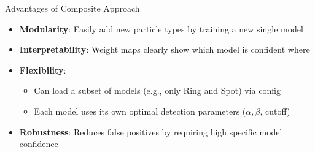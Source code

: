 \begin{frame}{Advantages of Composite Approach}
\begin{itemize}
    \item \textbf{Modularity}: Easily add new particle types by training a new single model
    \item \textbf{Interpretability}: Weight maps clearly show which model is confident where
    \item \textbf{Flexibility}: 
    \begin{itemize}
        \item Can load a subset of models (e.g., only Ring and Spot) via config
        \item Each model uses its own optimal detection parameters ($\alpha, \beta$, cutoff)
    \end{itemize}
    \item \textbf{Robustness}: Reduces false positives by requiring high specific model confidence
\end{itemize}
\end{frame}

